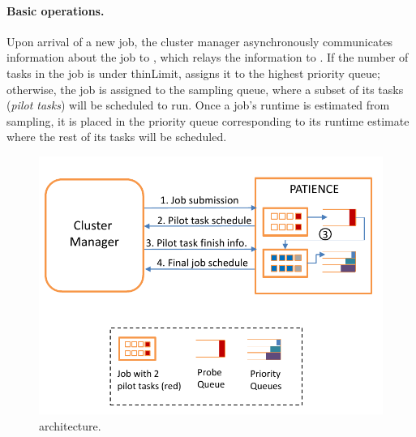 \paragraph{Basic operations.}
Upon arrival of a new job, the cluster manager asynchronously communicates
information about the job to \gs, which relays the information to \slearn.  If the
number of tasks in the job is under thinLimit, \slearn assigns it
to the highest priority queue; otherwise, the job is assigned to the
sampling queue, where a subset of its tasks (\textit{pilot tasks}) will be scheduled to run.
Once a job's runtime is estimated from sampling, it is placed in the
priority queue corresponding to its runtime estimate where the rest of its tasks
will be scheduled.

\begin{figure}[tp]
  \centering
  \includegraphics[page=2, width=0.95\linewidth]{figures/others/arch.pdf}
  \caption{\name architecture.}
  \label{fig:design:arch}
	\vspace{-0.1in}
\end{figure}
\fi


